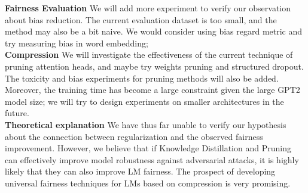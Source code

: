 
\noindent \textbf{Fairness Evaluation} \quad We will add more experiment to verify our observation about bias reduction. The current evaluation dataset is too small, and the method may also be a bit naive. We would consider using bias regard metric \cite{Sheng2019TheWW} and try measuring bias in word embedding;\\

\noindent \textbf{Compression} \quad We will investigate the effectiveness of the current technique of pruning attention heads, and maybe try weights pruning and structured dropout. The toxicity and bias experiments for pruning methods will also be added. Moreover, the training time has become a large constraint given the large GPT2 model size; we will try to design experiments on smaller architectures in the future.\\

 \noindent \textbf{Theoretical explanation} \quad We have thus far unable to verify our hypothesis about the connection between regularization and the observed fairness improvement. However, we believe that if Knowledge Distillation and Pruning can effectively improve model robustness against adversarial attacks\cite{Papernot2016DistillationAA}, it is highly likely that they can also improve LM fairness. The prospect of developing universal fairness techniques for LMs based on compression is very promising. 